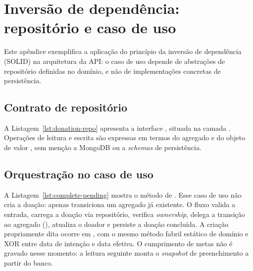 \chapter{Inversão de dependência: repositório e caso de uso}
\label{ap:dip}

Este apêndice exemplifica a aplicação do princípio da inversão de dependência (SOLID) na arquitetura da API: o caso de uso depende de abstrações de repositório definidas no domínio, e não de implementações concretas de persistência.

\section{Contrato de repositório}

A Listagem~\ref{lst:donation-repo} apresenta a interface , situada na camada . Operações de leitura e escrita são expressas em termos do agregado  e do objeto de valor , sem menção a MongoDB ou a \textit{schemas} de persistência.



\section{Orquestração no caso de uso}

A Listagem~\ref{lst:complete-pending} mostra o método  de . Esse caso de uso não cria a doação: apenas transiciona um agregado já existente. O fluxo valida a entrada, carrega a doação via repositório, verifica \textit{ownership}, delega a transição ao agregado (), atualiza o doador e persiste a doação concluída. A criação propriamente dita ocorre em , com o mesmo método fabril estático de domínio e XOR entre data de intenção e data efetiva. O cumprimento de metas não é gravado nesse momento: a leitura seguinte monta o \textit{snapshot} de preenchimento a partir do banco.


